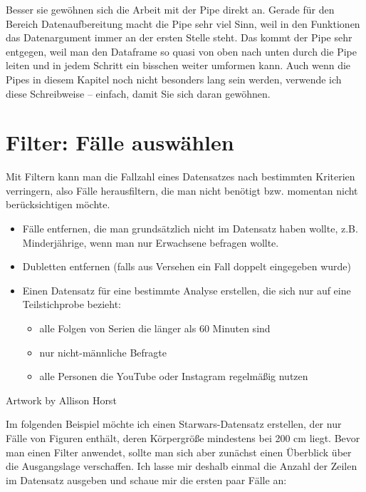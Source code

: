 \documentclass[
]{book}
\begin{document}
Besser sie gewöhnen sich die Arbeit mit der Pipe direkt an. Gerade für den Bereich Datenaufbereitung macht die Pipe sehr viel Sinn, weil in den Funktionen das Datenargument immer an der ersten Stelle steht. Das kommt der Pipe sehr entgegen, weil man den Dataframe so quasi von oben nach unten durch die Pipe leiten und in jedem Schritt ein bisschen weiter umformen kann. Auch wenn die Pipes in diesem Kapitel noch nicht besonders lang sein werden, verwende ich diese Schreibweise -- einfach, damit Sie sich daran gewöhnen.

\hypertarget{filter-fuxe4lle-auswuxe4hlen}{%
\section{Filter: Fälle auswählen}\label{filter-fuxe4lle-auswuxe4hlen}}

Mit Filtern kann man die Fallzahl eines Datensatzes nach bestimmten Kriterien verringern, also Fälle herausfiltern, die man nicht benötigt bzw. momentan nicht berücksichtigen möchte.

\begin{itemize}
\item
  Fälle entfernen, die man grundsätzlich nicht im Datensatz haben wollte, z.B. Minderjährige, wenn man nur Erwachsene befragen wollte.
\item
  Dubletten entfernen (falls aus Versehen ein Fall doppelt eingegeben wurde)
\item
  Einen Datensatz für eine bestimmte Analyse erstellen, die sich nur auf eine Teilstichprobe bezieht:

  \begin{itemize}
  \item
    alle Folgen von Serien die länger als 60 Minuten sind
  \item
    nur nicht-männliche Befragte
  \item
    alle Personen die YouTube oder Instagram regelmäßig nutzen
  \end{itemize}
\end{itemize}

Artwork by Allison Horst

Im folgenden Beispiel möchte ich einen Starwars-Datensatz erstellen, der nur Fälle von Figuren enthält, deren Körpergröße mindestens bei 200 cm liegt. Bevor man einen Filter anwendet, sollte man sich aber zunächst einen Überblick über die Ausgangslage verschaffen. Ich lasse mir deshalb einmal die Anzahl der Zeilen im Datensatz ausgeben und schaue mir die ersten paar Fälle an:
\end{document}
